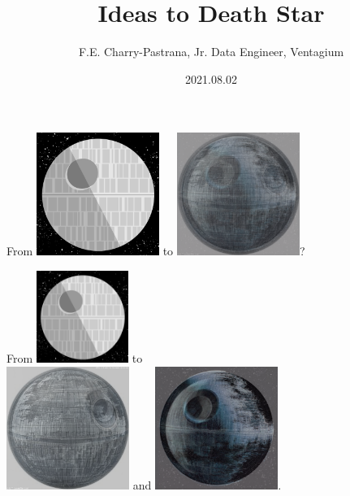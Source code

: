 \documentclass[10pt]{beamer}
\title{Ideas to Death Star}
\author{F.E. Charry-Pastrana, Jr. Data Engineer, Ventagium}
\date{2021.08.02}
\begin{document}
\begin{frame}
\titlepage
\end{frame}


\begin{frame}{}
\begin{center}
From
\includegraphics[width=40mm,scale=1.5]{img_2/death-star.png}
to
\includegraphics[width=40mm,scale=1.5]{img_2/death_1.png}? 
\end{center}
\end{frame}

\begin{frame}{}
\begin{center}
From
\includegraphics[width=30mm,scale=1.5]{img_2/death-star.png}
to\vspace{0.5cm}\\
\includegraphics[width=40mm,scale=1.5]{img_2/death_1_1.png}
and
\includegraphics[width=40mm,scale=1.5]{img_2/death_1_2.png}.
\end{center}
\end{frame}
\end{document}

